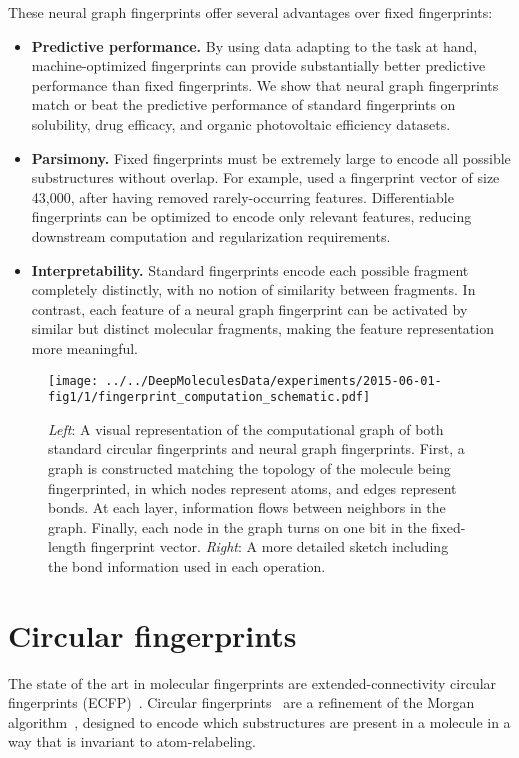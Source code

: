 \documentclass{article}
\newcommand{\citep}{\cite}
\begin{document}
These neural graph fingerprints offer several advantages over fixed fingerprints:
\begin{itemize}
\item {\bf Predictive performance.}
By using data adapting to the task at hand, machine-optimized fingerprints can provide substantially better predictive performance than fixed fingerprints.
We show that neural graph fingerprints match or beat the predictive performance of standard fingerprints on 
solubility, drug efficacy, and organic photovoltaic efficiency datasets.
\item {\bf Parsimony.}
Fixed fingerprints must be extremely large to encode all possible substructures without overlap.
For example, \cite{unterthinerdeep} used a fingerprint vector of size 43,000, after having removed rarely-occurring features.
Differentiable fingerprints can be optimized to encode only relevant features, reducing downstream computation and regularization requirements.
\item {\bf Interpretability.}
Standard fingerprints encode each possible fragment completely distinctly, with no notion of similarity between fragments.
In contrast, each feature of a neural graph fingerprint can be activated by similar but distinct molecular fragments, making the feature representation more meaningful.
\end{itemize}

\begin{figure}
\centerline{\texttt{[image: ../../DeepMoleculesData/experiments/2015-06-01-fig1/1/fingerprint\_computation\_schematic.pdf]}
\hspace{5em}
}
\vspace{-1mm}
\caption{\emph{Left}: A visual representation of the computational graph of both standard circular fingerprints and neural graph fingerprints.
First, a graph is constructed matching the topology of the molecule being fingerprinted, in which nodes represent atoms, and edges represent bonds.
At each layer, information flows between neighbors in the graph.
Finally, each node in the graph turns on one bit in the fixed-length fingerprint vector.
\emph{Right}: A more detailed sketch including the bond information used in each operation.}
\label{fig:architecture sketch}
\end{figure}

\section{Circular fingerprints}
\vspace{-3mm}
The state of the art in molecular fingerprints are extended-connectivity circular fingerprints (ECFP)~\citep{ECFP2010}.
Circular fingerprints~\citep{glem2006circular} are a refinement of the Morgan algorithm~\citep{morgan1965generation}, designed to encode which substructures are present in a molecule in a way that is invariant to atom-relabeling.
\end{document}
